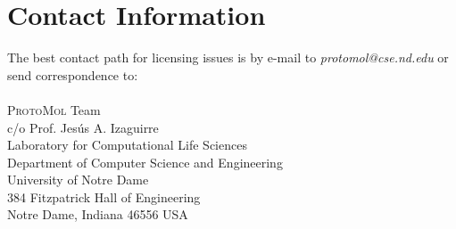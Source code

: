 \documentclass[11pt]{report}
\newcommand{\ProtoMol}{\textsc{ProtoMol }}
\begin{document}
\section{Contact Information}

The best contact path for licensing issues is by e-mail to  
{\it protomol@cse.nd.edu} or send correspondence to: \\ \\
\ProtoMol Team\\
c/o Prof. Jes\'{u}s A. Izaguirre\\
Laboratory for Computational Life Sciences\\
Department of Computer Science and Engineering\\
University of Notre Dame\\
384 Fitzpatrick Hall of Engineering\\
Notre Dame, Indiana 46556 USA



                                     
\end{document}
